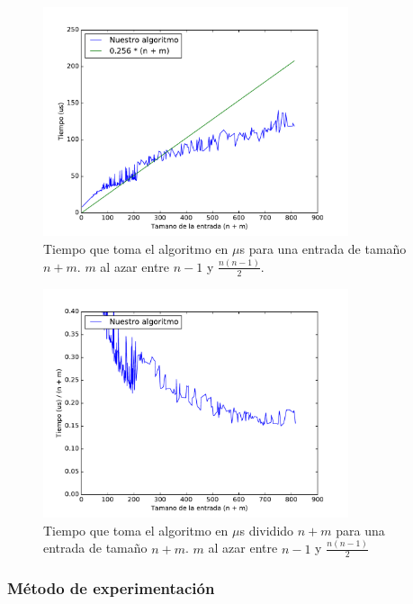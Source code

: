 \begin{figure}[H]
 \centering
	\includegraphics[width=0.8\textwidth]{img/exp/problema1-promedio.pdf}
	\caption{\footnotesize Tiempo que toma el algoritmo en $\mu$s para una entrada de tamaño $n + m$. $m$ al azar entre $n-1$ y $\frac{n(n-1)}{2}$.}
	\label{fig:problema1-promedio}
\end{figure}

\begin{figure}[H]
 \centering
	\includegraphics[width=0.8\textwidth]{img/exp/problema1-promedio2.pdf}
	\caption{\footnotesize Tiempo que toma el algoritmo en $\mu$s dividido $n + m$ para una entrada de tamaño $n + m$.  $m$ al azar entre $n-1$ y $\frac{n(n-1)}{2}$}
	\label{fig:problema1-promedio2}
\end{figure}

\subsubsection{M\'etodo de experimentación}
